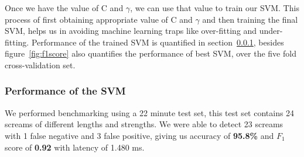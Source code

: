 Once we have the value of C and \(\gamma\), we can use that value to train our SVM. This process of first obtaining appropriate value of C and \(\gamma\) and then training the final SVM, helps us in avoiding machine learning traps like over-fitting and under-fitting.
Performance of the trained SVM is quantified in section~\ref{sssec:performanceSVM}, besides figure~\ref{fig:f1score} also quantifies the performance of best SVM, over the five fold cross-validation set.

\subsubsection{Performance of the SVM}
\label{sssec:performanceSVM}

We performed benchmarking using a 22 minute test set, this test set contains 24 screams of different lengths and strengths. We were able to detect 23 screams with 1 false negative and 3 false positive, giving us accuracy of \textbf{95.8\%} and \(F_1\) score of \textbf{0.92} with latency of 1.480 ms.

